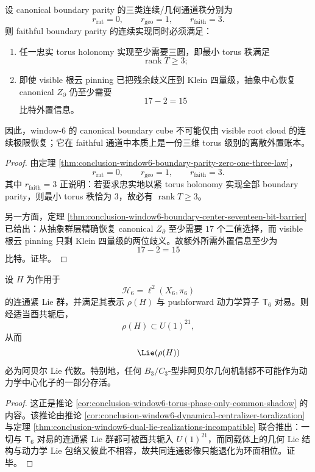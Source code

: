 \begin{corollary}\label{cor:conclusion-window6-boundary-threechannel-fifteenbit-externality}
设 canonical boundary parity 的三类连续/几何通道秩分别为
\[
r_{\mathrm{rat}}=0,\qquad
r_{\mathrm{geo}}=1,\qquad
r_{\mathrm{faith}}=3.
\]
则 faithful boundary parity 的连续实现同时必须满足：
\begin{enumerate}
\normalfont
  \item 任一忠实 torus holonomy 实现至少需要三圆，即最小 torus 秩满足
  \[
  \operatorname{rank}T\ge 3;
  \]
  \item 即使 visible 根云 pinning 已把残余歧义压到 Klein 四量级，抽象中心恢复 canonical \(Z_{\partial}\) 仍至少需要
  \[
  17-2=15
  \]
  比特外置信息。
\end{enumerate}
因此，window-\(6\) 的 canonical boundary cube 不可能仅由 visible root cloud 的连续极限恢复；它在 faithful 通道中本质上是一份三维 torus 级别的离散外置账本。
\end{corollary}
\begin{proof}
由定理 \ref{thm:conclusion-window6-boundary-parity-zero-one-three-law}，
\[
r_{\mathrm{rat}}=0,\qquad r_{\mathrm{geo}}=1,\qquad r_{\mathrm{faith}}=3.
\]
其中 \(r_{\mathrm{faith}}=3\) 正说明：若要求忠实地以紧 torus holonomy 实现全部 boundary parity，则最小 torus 秩恰为 \(3\)，故必有 \(\operatorname{rank}T\ge 3\)。

另一方面，定理 \ref{thm:conclusion-window6-boundary-center-seventeen-bit-barrier} 已给出：从抽象群层精确恢复 canonical \(Z_{\partial}\) 至少需要 \(17\) 个二值选择，而 visible 根云 pinning 只剩 Klein 四量级的两位歧义。故额外所需外置信息至少为
\[
17-2=15
\]
比特。证毕。
\end{proof}

\begin{theorem}\label{thm:conclusion-window6-dynamical-centralizer-torus-collapse}
设 \(H\) 为作用于
\[
\mathcal H_6=\ell^2(X_6,\pi_6)
\]
的连通紧 Lie 群，并满足其表示 \(\rho(H)\) 与 pushforward 动力学算子 \(\mathsf T_6\) 对易。则经适当酉共轭后，
\[
\rho(H)\subset U(1)^{21},
\]
从而
\[
\Lie(\rho(H))
\]
必为阿贝尔 Lie 代数。特别地，任何 \(B_3/C_3\)-型非阿贝尔几何机制都不可能作为动力学中心化子的一部分存活。
\end{theorem}
\begin{proof}
这正是推论 \ref{cor:conclusion-window6-torus-phase-only-common-shadow} 的内容。该推论由推论 \ref{cor:conclusion-window6-dynamical-centralizer-toralization} 与定理 \ref{thm:conclusion-window6-dual-lie-realizations-incompatible} 联合推出：一切与 \(\mathsf T_6\) 对易的连通紧 Lie 群都可被酉共轭入 \(U(1)^{21}\)，而同载体上的几何 Lie 结构与动力学 Lie 包络又彼此不相容，故共同连通影像只能退化为环面相位。证毕。
\end{proof}

